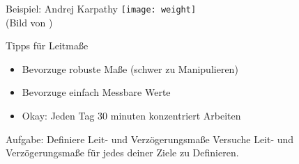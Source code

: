 \begin{frame}[c]{Beispiel: Andrej Karpathy}
    \texttt{[image: weight]} \\
    (Bild von \cite{weight-pic})
\end{frame}


\begin{frame}[c]{Tipps für Leitmaße}
    \large
    \begin{itemize}[<+(1)->]
        \item Bevorzuge robuste Maße (schwer zu Manipulieren)
        \item Bevorzuge einfach Messbare Werte
        \item Okay: Jeden Tag 30 minuten konzentriert Arbeiten
    \end{itemize}
\end{frame}


\begin{frame}[c]
    \begin{block}{Aufgabe: Definiere Leit- und Verzögerungsmaße}
        Versuche Leit- und Verzögerungsmaße für jedes deiner Ziele zu
        Definieren.
    \end{block}
\end{frame}


%
%
%
%




